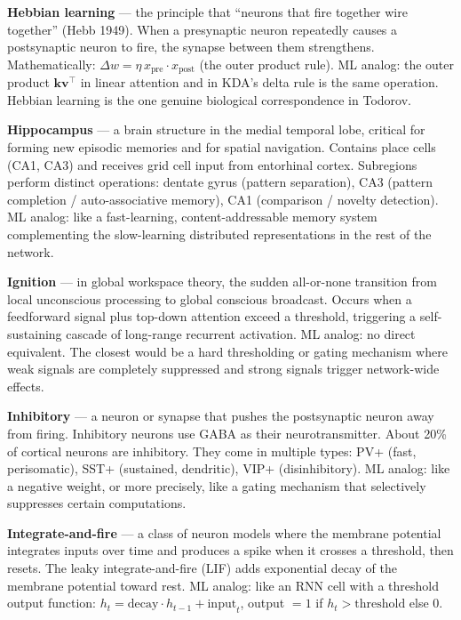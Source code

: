 \documentclass[11pt,a4paper]{article}
\begin{document}
\textbf{Hebbian learning} --- the principle that ``neurons that fire together wire together'' (Hebb 1949). When a presynaptic neuron repeatedly causes a postsynaptic neuron to fire, the synapse between them strengthens. Mathematically: $\Delta w = \eta \, x_{\mathrm{pre}} \cdot x_{\mathrm{post}}$ (the outer product rule). ML analog: the outer product $\mathbf{k} \mathbf{v}^\top$ in linear attention and in KDA's delta rule is the same operation. Hebbian learning is the one genuine biological correspondence in Todorov.

\textbf{Hippocampus} --- a brain structure in the medial temporal lobe, critical for forming new episodic memories and for spatial navigation. Contains place cells (CA1, CA3) and receives grid cell input from entorhinal cortex. Subregions perform distinct operations: dentate gyrus (pattern separation), CA3 (pattern completion / auto-associative memory), CA1 (comparison / novelty detection). ML analog: like a fast-learning, content-addressable memory system complementing the slow-learning distributed representations in the rest of the network.

\textbf{Ignition} --- in global workspace theory, the sudden all-or-none transition from local unconscious processing to global conscious broadcast. Occurs when a feedforward signal plus top-down attention exceed a threshold, triggering a self-sustaining cascade of long-range recurrent activation. ML analog: no direct equivalent. The closest would be a hard thresholding or gating mechanism where weak signals are completely suppressed and strong signals trigger network-wide effects.

\textbf{Inhibitory} --- a neuron or synapse that pushes the postsynaptic neuron away from firing. Inhibitory neurons use GABA as their neurotransmitter. About 20\% of cortical neurons are inhibitory. They come in multiple types: PV+ (fast, perisomatic), SST+ (sustained, dendritic), VIP+ (disinhibitory). ML analog: like a negative weight, or more precisely, like a gating mechanism that selectively suppresses certain computations.

\textbf{Integrate-and-fire} --- a class of neuron models where the membrane potential integrates inputs over time and produces a spike when it crosses a threshold, then resets. The leaky integrate-and-fire (LIF) adds exponential decay of the membrane potential toward rest. ML analog: like an RNN cell with a threshold output function: $h_t = \mathrm{decay} \cdot h_{t-1} + \mathrm{input}_t$, output $= 1$ if $h_t > \mathrm{threshold}$ else $0$.
\end{document}
